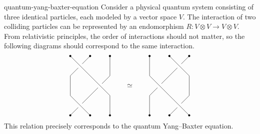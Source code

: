 \begin{example}{quantum-yang-baxter-equation}
    Consider a physical quantum system consisting of three identical particles, each modeled by a vector space $V$. The interaction of two colliding particles can be represented by an endomorphism $R : V \otimes V \to V \otimes V$. From relativistic principles, the order of interactions should not matter, so the following diagrams should correspond to the same interaction.
    \[ \begin{tikzpicture}
        \begin{scope}
            \draw[black,fill=black] (0, 0) circle (.3ex);
            \draw[black,fill=black] (1, 0) circle (.3ex);
            \draw[black,fill=black] (2, 0) circle (.3ex);
            \draw[black,fill=black] (0, 3) circle (.3ex);
            \draw[black,fill=black] (1, 3) circle (.3ex);
            \draw[black,fill=black] (2, 3) circle (.3ex);
            \draw (0, 3) -- (1, 2) -- (2, 1) -- (2, 0);
            \draw (1, 3) -- (0.6, 2.6);
            \draw (0.4, 2.4) -- (0, 2) -- (0, 1) -- (1, 0);
            \draw (2, 3) -- (2, 2) -- (1.6, 1.6);
            \draw (1.4, 1.4) -- (0.6, 0.6);
            \draw (0.4, 0.4) -- (0, 0);
        \end{scope}
        \node at (3cm,1.5cm) {$\simeq$};
        \begin{scope}[xshift=4cm]
            \draw[black,fill=black] (0, 0) circle (.3ex);
            \draw[black,fill=black] (1, 0) circle (.3ex);
            \draw[black,fill=black] (2, 0) circle (.3ex);
            \draw[black,fill=black] (0, 3) circle (.3ex);
            \draw[black,fill=black] (1, 3) circle (.3ex);
            \draw[black,fill=black] (2, 3) circle (.3ex);
            \draw (0, 3) -- (0, 2) -- (1, 1) -- (2, 0);
            \draw (1, 3) -- (2, 2) -- (2, 1) -- (1.6, 0.6);
            \draw (1.4, 0.4) -- (1, 0);
            \draw (2, 3) -- (1.6, 2.6);
            \draw (1.4, 2.4) -- (0.6, 1.6);
            \draw (0.4, 1.4) -- (0, 1) -- (0, 0);
        \end{scope}
    \end{tikzpicture} \]
    This relation precisely corresponds to the quantum Yang--Baxter equation.
\end{example}
